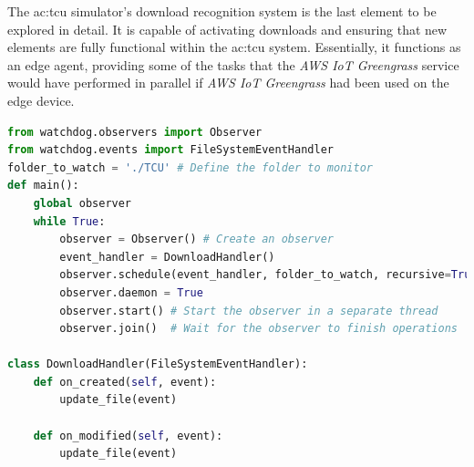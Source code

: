 The \gls{ac:tcu} simulator's download recognition system is the last element to be explored in detail. It is capable of activating downloads and ensuring that new elements are fully functional within the \gls{ac:tcu} system. Essentially, it functions as an edge agent, providing some of the tasks that the \textit{AWS IoT Greengrass} service would have performed in parallel if \textit{AWS IoT Greengrass} had been used on the edge device.
\begin{lstlisting}[language=Python, caption={Main function of the update recognition system }, label=lst:UpdateRecognition]
from watchdog.observers import Observer
from watchdog.events import FileSystemEventHandler
folder_to_watch = './TCU' # Define the folder to monitor
def main():
    global observer
    while True:
        observer = Observer() # Create an observer
        event_handler = DownloadHandler()
        observer.schedule(event_handler, folder_to_watch, recursive=True) # Attach the event handler to the observer
        observer.daemon = True
        observer.start() # Start the observer in a separate thread
        observer.join()  # Wait for the observer to finish operations

class DownloadHandler(FileSystemEventHandler):
    def on_created(self, event):
        update_file(event)
                        
    def on_modified(self, event):
        update_file(event)
\end{lstlisting}

